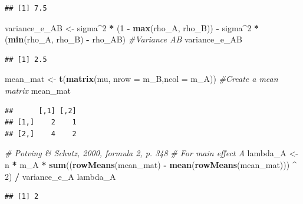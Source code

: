 \documentclass[]{book}
\newenvironment{Shaded}{\begin{snugshade}}{\end{snugshade}}
\newcommand{\CommentTok}[1]{\textcolor[rgb]{0.56,0.35,0.01}{\textit{#1}}}
\newcommand{\DataTypeTok}[1]{\textcolor[rgb]{0.13,0.29,0.53}{#1}}
\newcommand{\DecValTok}[1]{\textcolor[rgb]{0.00,0.00,0.81}{#1}}
\newcommand{\KeywordTok}[1]{\textcolor[rgb]{0.13,0.29,0.53}{\textbf{#1}}}
\newcommand{\NormalTok}[1]{#1}
\newcommand{\OperatorTok}[1]{\textcolor[rgb]{0.81,0.36,0.00}{\textbf{#1}}}
\newcommand{\StringTok}[1]{\textcolor[rgb]{0.31,0.60,0.02}{#1}}
\begin{document}
\begin{verbatim}
## [1] 7.5
\end{verbatim}

\begin{Shaded}
\begin{Highlighting}[]
\NormalTok{variance_e_AB <-}\StringTok{ }\NormalTok{sigma}\OperatorTok{^}\DecValTok{2} \OperatorTok{*}\StringTok{ }\NormalTok{(}\DecValTok{1} \OperatorTok{-}\StringTok{ }\KeywordTok{max}\NormalTok{(rho_A, rho_B)) }\OperatorTok{-}\StringTok{ }\NormalTok{sigma}\OperatorTok{^}\DecValTok{2} \OperatorTok{*}\StringTok{ }\NormalTok{(}\KeywordTok{min}\NormalTok{(rho_A, rho_B) }\OperatorTok{-}\StringTok{ }\NormalTok{rho_AB) }\CommentTok{#Variance AB}
\NormalTok{variance_e_AB}
\end{Highlighting}
\end{Shaded}

\begin{verbatim}
## [1] 2.5
\end{verbatim}

\begin{Shaded}
\begin{Highlighting}[]
\NormalTok{mean_mat <-}\StringTok{ }\KeywordTok{t}\NormalTok{(}\KeywordTok{matrix}\NormalTok{(mu, }\DataTypeTok{nrow =}\NormalTok{ m_B,}\DataTypeTok{ncol =}\NormalTok{ m_A)) }\CommentTok{#Create a mean matrix}
\NormalTok{mean_mat}
\end{Highlighting}
\end{Shaded}

\begin{verbatim}
##      [,1] [,2]
## [1,]    2    1
## [2,]    4    2
\end{verbatim}

\begin{Shaded}
\begin{Highlighting}[]
\CommentTok{# Potving & Schutz, 2000, formula 2, p. 348}
\CommentTok{# For main effect A}
\NormalTok{lambda_A <-}\StringTok{ }\NormalTok{n }\OperatorTok{*}\StringTok{ }\NormalTok{m_A }\OperatorTok{*}\StringTok{ }\KeywordTok{sum}\NormalTok{((}\KeywordTok{rowMeans}\NormalTok{(mean_mat) }\OperatorTok{-}\StringTok{ }\KeywordTok{mean}\NormalTok{(}\KeywordTok{rowMeans}\NormalTok{(mean_mat))) }\OperatorTok{^}\StringTok{ }\DecValTok{2}\NormalTok{) }\OperatorTok{/}\StringTok{ }\NormalTok{variance_e_A }
\NormalTok{lambda_A}
\end{Highlighting}
\end{Shaded}

\begin{verbatim}
## [1] 2
\end{verbatim}
\end{document}
